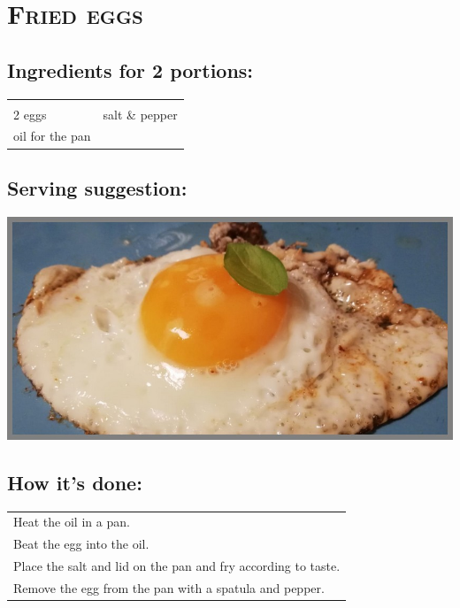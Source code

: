 \section{\textsc{Fried eggs}}

\subsection*{Ingredients for 2 portions:}

\begin{tabular}{p{7.5cm} p{7.5cm}}
	& \\
	2 eggs & salt \& pepper \\
	oil for the pan & 
\end{tabular}

\subsection*{Serving suggestion:}

\includegraphics[width=\textwidth]{img/spiegelei.jpg} \cite{spiegelei}

\subsection*{How it's done:}

\begin{tabular}{p{15cm}}
	\\
	Heat the oil in a pan.\\
	Beat the egg into the oil.\\
	Place the salt and lid on the pan and fry according to taste.\\
	Remove the egg from the pan with a spatula and pepper.
\end{tabular}
